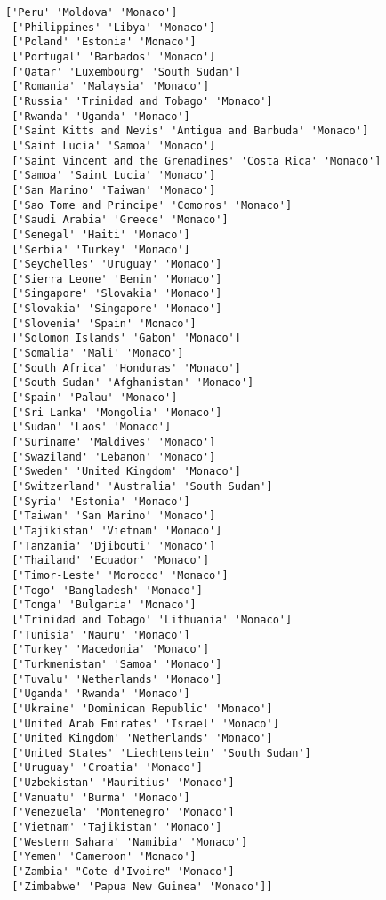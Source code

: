 \documentclass[11pt]{article}
\begin{document}
\begin{Verbatim}[commandchars=\\\{\}]
 ['Peru' 'Moldova' 'Monaco']
 ['Philippines' 'Libya' 'Monaco']
 ['Poland' 'Estonia' 'Monaco']
 ['Portugal' 'Barbados' 'Monaco']
 ['Qatar' 'Luxembourg' 'South Sudan']
 ['Romania' 'Malaysia' 'Monaco']
 ['Russia' 'Trinidad and Tobago' 'Monaco']
 ['Rwanda' 'Uganda' 'Monaco']
 ['Saint Kitts and Nevis' 'Antigua and Barbuda' 'Monaco']
 ['Saint Lucia' 'Samoa' 'Monaco']
 ['Saint Vincent and the Grenadines' 'Costa Rica' 'Monaco']
 ['Samoa' 'Saint Lucia' 'Monaco']
 ['San Marino' 'Taiwan' 'Monaco']
 ['Sao Tome and Principe' 'Comoros' 'Monaco']
 ['Saudi Arabia' 'Greece' 'Monaco']
 ['Senegal' 'Haiti' 'Monaco']
 ['Serbia' 'Turkey' 'Monaco']
 ['Seychelles' 'Uruguay' 'Monaco']
 ['Sierra Leone' 'Benin' 'Monaco']
 ['Singapore' 'Slovakia' 'Monaco']
 ['Slovakia' 'Singapore' 'Monaco']
 ['Slovenia' 'Spain' 'Monaco']
 ['Solomon Islands' 'Gabon' 'Monaco']
 ['Somalia' 'Mali' 'Monaco']
 ['South Africa' 'Honduras' 'Monaco']
 ['South Sudan' 'Afghanistan' 'Monaco']
 ['Spain' 'Palau' 'Monaco']
 ['Sri Lanka' 'Mongolia' 'Monaco']
 ['Sudan' 'Laos' 'Monaco']
 ['Suriname' 'Maldives' 'Monaco']
 ['Swaziland' 'Lebanon' 'Monaco']
 ['Sweden' 'United Kingdom' 'Monaco']
 ['Switzerland' 'Australia' 'South Sudan']
 ['Syria' 'Estonia' 'Monaco']
 ['Taiwan' 'San Marino' 'Monaco']
 ['Tajikistan' 'Vietnam' 'Monaco']
 ['Tanzania' 'Djibouti' 'Monaco']
 ['Thailand' 'Ecuador' 'Monaco']
 ['Timor-Leste' 'Morocco' 'Monaco']
 ['Togo' 'Bangladesh' 'Monaco']
 ['Tonga' 'Bulgaria' 'Monaco']
 ['Trinidad and Tobago' 'Lithuania' 'Monaco']
 ['Tunisia' 'Nauru' 'Monaco']
 ['Turkey' 'Macedonia' 'Monaco']
 ['Turkmenistan' 'Samoa' 'Monaco']
 ['Tuvalu' 'Netherlands' 'Monaco']
 ['Uganda' 'Rwanda' 'Monaco']
 ['Ukraine' 'Dominican Republic' 'Monaco']
 ['United Arab Emirates' 'Israel' 'Monaco']
 ['United Kingdom' 'Netherlands' 'Monaco']
 ['United States' 'Liechtenstein' 'South Sudan']
 ['Uruguay' 'Croatia' 'Monaco']
 ['Uzbekistan' 'Mauritius' 'Monaco']
 ['Vanuatu' 'Burma' 'Monaco']
 ['Venezuela' 'Montenegro' 'Monaco']
 ['Vietnam' 'Tajikistan' 'Monaco']
 ['Western Sahara' 'Namibia' 'Monaco']
 ['Yemen' 'Cameroon' 'Monaco']
 ['Zambia' "Cote d'Ivoire" 'Monaco']
 ['Zimbabwe' 'Papua New Guinea' 'Monaco']]

    \end{Verbatim}


    
    
    
    
\end{document}
